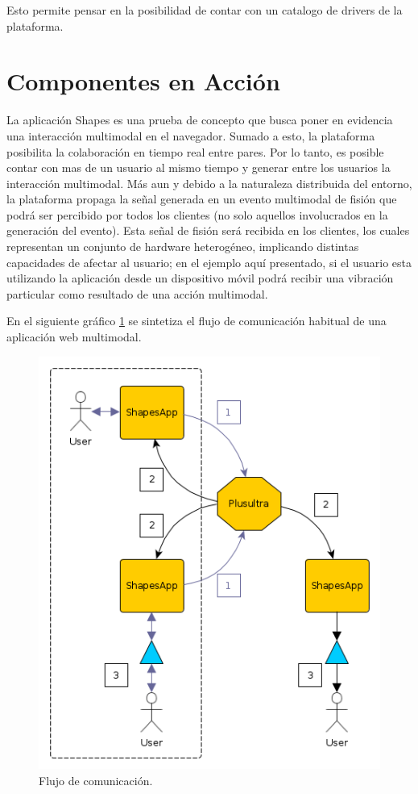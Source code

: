 Esto permite pensar en la posibilidad de contar con un catalogo de drivers de la plataforma.

\section{Componentes en Acción}
La aplicación Shapes es una prueba de concepto que busca poner en evidencia una interacción multimodal en el navegador. Sumado a esto, la plataforma posibilita la colaboración en tiempo real entre pares. Por lo tanto, es posible contar con mas de un usuario al mismo tiempo y generar entre los usuarios la interacción multimodal. Más aun y debido a la naturaleza distribuida del entorno, la plataforma propaga la señal generada en un evento multimodal de fisión que podrá ser  percibido por todos los clientes (no solo aquellos involucrados en la generación del evento). Esta señal de fisión será recibida en los clientes, los cuales representan un conjunto de hardware heterogéneo, implicando distintas capacidades de afectar al usuario; en el ejemplo aquí presentado, si el usuario esta utilizando la aplicación desde un dispositivo móvil podrá recibir una vibración particular como resultado de una acción multimodal. 

En el siguiente gráfico \ref{fig:demo_show_shapes} se sintetiza el flujo de comunicación habitual de una aplicación web multimodal.


\begin{center}
  \begin{figure}[h]
    \includegraphics[scale=0.7]{gfx/example_showcase}
    \caption{Flujo de comunicación.}    
    \label{fig:demo_show_shapes}
  \end{figure}
\end{center}

